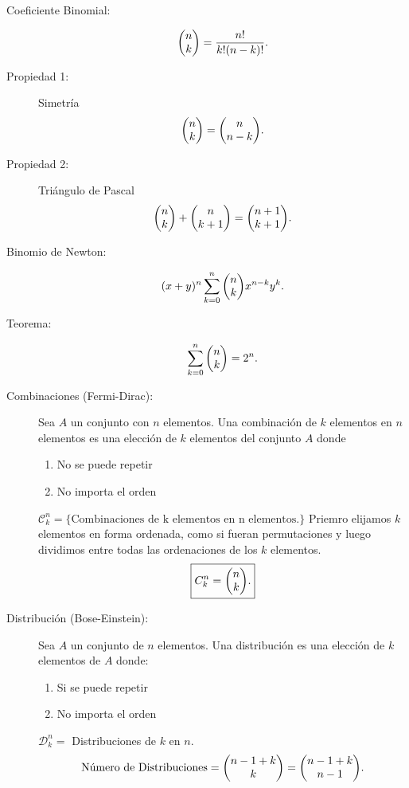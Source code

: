 \begin{description}
    \item[Coeficiente Binomial: ] 
        $$ \mqty(n \\ k) = \frac{n!}{k! (n - k)!}. $$
    \item[Propiedad 1: ] Simetría
        $$ \mqty(n \\ k) = \mqty(n \\ n - k). $$
    \item[Propiedad 2: ] Triángulo de Pascal
        $$ \mqty(n \\ k) + \mqty(n \\ k + 1) = \mqty(n + 1 \\ k + 1). $$
    \item[Binomio de Newton: ] 
        $$ (x + y)^n \sum _{k=0} ^n \mqty(n \\ k) x^{n - k} y^k . $$
    \item[Teorema: ] 
        $$ \sum _{k=0}  ^n \mqty(n \\ k) = 2^n . $$
    \item[Combinaciones (Fermi-Dirac): ] Sea $A$ un conjunto con $n$ elementos. Una combinación de $k$ elementos en $n$ elementos es una elección de $k$ elementos del conjunto $A$ donde
    \begin{enumerate}
        \item No se puede repetir
        \item No importa el orden
    \end{enumerate}
    $\mathcal{C} _k ^n = \{ \text{Combinaciones de k elementos en n elementos}. \}$ Priemro elijamos $k$ elementos en forma ordenada, como si fueran permutaciones y luego dividimos entre todas las ordenaciones de los $k$ elementos.
        $$ \boxed{ C_k ^n = \mqty(n \\ k). } $$
    \item[Distribución (Bose-Einstein): ] Sea $A$ un conjunto de $n$ elementos. Una distribución es una elección de $k$ elementos de $A$ donde:
    \begin{enumerate}
        \item Si se puede repetir
        \item No importa el orden
    \end{enumerate}
    $\mathcal{D} _k ^n = $ Distribuciones de $k$ en $n$.
        $$ \text{Número de Distribuciones} = \mqty(n - 1 + k \\ k) = \mqty(n - 1 + k \\ n - 1). $$
\end{description}


